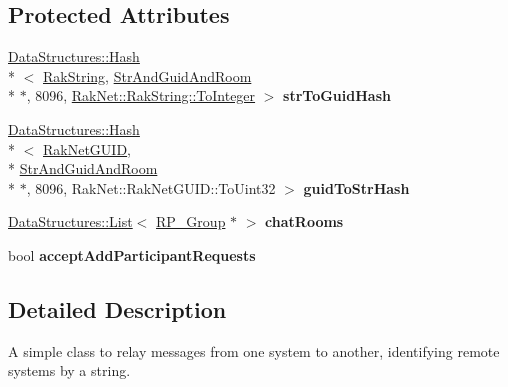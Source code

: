 \subsection*{Protected Attributes}
\begin{DoxyCompactItemize}
\item 
\hypertarget{class_rak_net_1_1_relay_plugin_af6c218290e66e4acbc49c1a6a5242975}{\hyperlink{class_data_structures_1_1_hash}{Data\-Structures\-::\-Hash}\\*
$<$ \hyperlink{class_rak_net_1_1_rak_string}{Rak\-String}, \hyperlink{struct_rak_net_1_1_relay_plugin_1_1_str_and_guid_and_room}{Str\-And\-Guid\-And\-Room} \\*
$\ast$, 8096, \hyperlink{class_rak_net_1_1_rak_string_a79f546baedf74c64a820297b40590250}{Rak\-Net\-::\-Rak\-String\-::\-To\-Integer} $>$ {\bfseries str\-To\-Guid\-Hash}}\label{class_rak_net_1_1_relay_plugin_af6c218290e66e4acbc49c1a6a5242975}

\item 
\hypertarget{class_rak_net_1_1_relay_plugin_aae0a31e12cab443ffa52a083ec4d13e2}{\hyperlink{class_data_structures_1_1_hash}{Data\-Structures\-::\-Hash}\\*
$<$ \hyperlink{struct_rak_net_1_1_rak_net_g_u_i_d}{Rak\-Net\-G\-U\-I\-D}, \\*
\hyperlink{struct_rak_net_1_1_relay_plugin_1_1_str_and_guid_and_room}{Str\-And\-Guid\-And\-Room} \\*
$\ast$, 8096, Rak\-Net\-::\-Rak\-Net\-G\-U\-I\-D\-::\-To\-Uint32 $>$ {\bfseries guid\-To\-Str\-Hash}}\label{class_rak_net_1_1_relay_plugin_aae0a31e12cab443ffa52a083ec4d13e2}

\item 
\hypertarget{class_rak_net_1_1_relay_plugin_a9c7c0a8992faa7dd708a03a07876a615}{\hyperlink{class_data_structures_1_1_list}{Data\-Structures\-::\-List}$<$ \hyperlink{struct_rak_net_1_1_relay_plugin_1_1_r_p___group}{R\-P\-\_\-\-Group} $\ast$ $>$ {\bfseries chat\-Rooms}}\label{class_rak_net_1_1_relay_plugin_a9c7c0a8992faa7dd708a03a07876a615}

\item 
\hypertarget{class_rak_net_1_1_relay_plugin_ab0ad21afe836d2bd64f0e27f759affa5}{bool {\bfseries accept\-Add\-Participant\-Requests}}\label{class_rak_net_1_1_relay_plugin_ab0ad21afe836d2bd64f0e27f759affa5}

\end{DoxyCompactItemize}


\subsection{Detailed Description}
A simple class to relay messages from one system to another, identifying remote systems by a string. 


